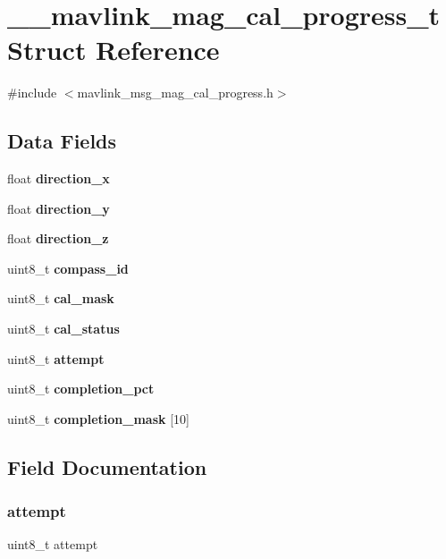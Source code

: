 \section{\+\_\+\+\_\+mavlink\+\_\+mag\+\_\+cal\+\_\+progress\+\_\+t Struct Reference}
\label{struct____mavlink__mag__cal__progress__t}


{\ttfamily \#include $<$mavlink\+\_\+msg\+\_\+mag\+\_\+cal\+\_\+progress.\+h$>$}

\subsection*{Data Fields}
\begin{DoxyCompactItemize}
\item 
float \textbf{ direction\+\_\+x}
\item 
float \textbf{ direction\+\_\+y}
\item 
float \textbf{ direction\+\_\+z}
\item 
uint8\+\_\+t \textbf{ compass\+\_\+id}
\item 
uint8\+\_\+t \textbf{ cal\+\_\+mask}
\item 
uint8\+\_\+t \textbf{ cal\+\_\+status}
\item 
uint8\+\_\+t \textbf{ attempt}
\item 
uint8\+\_\+t \textbf{ completion\+\_\+pct}
\item 
uint8\+\_\+t \textbf{ completion\+\_\+mask} [10]
\end{DoxyCompactItemize}


\subsection{Field Documentation}
\mbox{\label{struct____mavlink__mag__cal__progress__t_ab795aa8192c5ba701c8b6e8cf3351ea0}} 
\subsubsection{attempt}
{\footnotesize\ttfamily uint8\+\_\+t attempt}

\mbox{\label{struct____mavlink__mag__cal__progress__t_a77049d4398b1685c8b6a34b55450b010}} 
